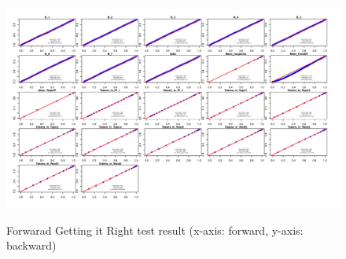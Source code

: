 \documentclass[a4paper]{article}
\begin{document}
   \begin{figure}[H]
   	\centering
   	\includegraphics[width=1.15\textwidth]{ForwardGiR.png}
   	\label{fig:forwardGiR}
   	\caption{Forwarad Getting it Right test result (x-axis: forward, y-axis: backward)}
   \end{figure}
\end{document}

